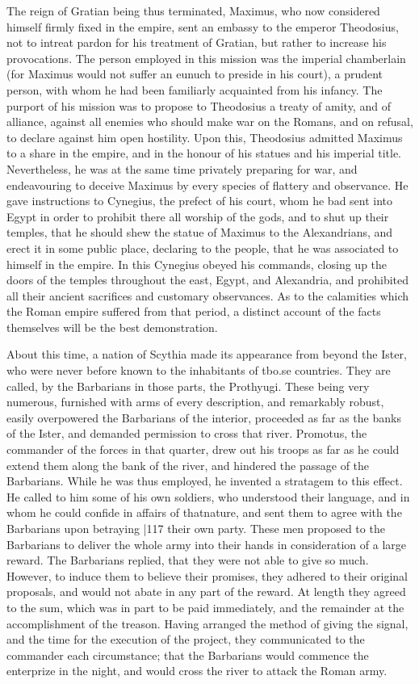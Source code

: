 The reign of Gratian being thus terminated, Maximus, who now considered himself firmly fixed in the empire, sent an embassy to the emperor Theodosius, not to intreat pardon for his treatment of Gratian, but rather to increase his provocations. The person employed in this mission was the imperial chamberlain (for Maximus would not suffer an eunuch to preside in his court), a prudent person, with whom he had been familiarly acquainted from his infancy. The purport of his mission was to propose to Theodosius a treaty of amity, and of alliance, against all enemies who should make war on the Romans, and on refusal, to declare against him open hostility. Upon this, Theodosius admitted Maximus to a share in the empire, and in the honour of his statues and his imperial title. Nevertheless, he was at the same time privately preparing for war, and endeavouring to deceive Maximus by every species of flattery and observance. He gave instructions to Cynegius, the prefect of his court, whom he bad sent into Egypt in order to prohibit there all worship of the gods, and to shut up their temples, that he should shew the statue of Maximus to the Alexandrians, and erect it in some public place, declaring to the people, that he was associated to himself in the empire. In this Cynegius obeyed his commands, closing up the doors of the temples throughout the east, Egypt, and Alexandria, and prohibited all their ancient sacrifices and customary observances. As to the calamities which the Roman empire suffered from that period, a distinct account of the facts themselves will be the best demonstration.

About this time, a nation of Scythia made its appearance from beyond the Ister, who were never before known to the inhabitants of tbo.se countries. They are called, by the Barbarians in those parts, the Prothyugi. These being very numerous, furnished with arms of every description, and remarkably robust, easily overpowered the Barbarians of the interior, proceeded as far as the banks of the Ister, and demanded permission to cross that river. Promotus, the commander of the forces in that quarter, drew out his troops as far as he could extend them along the bank of the river, and hindered the passage of the Barbarians. While he was thus employed, he invented a stratagem to this effect. He called to him some of his own soldiers, who understood their language, and in whom he could confide in affairs of that\emph{}nature, and sent them to agree with the Barbarians upon betraying
|117
their own party. These men proposed to the Barbarians to deliver the whole army into their hands in consideration of a large reward. The Barbarians replied, that they were not able to give so much. However, to induce them to believe their promises, they adhered to their original proposals, and would not abate in any part of the reward. At length they agreed to the sum, which was in part to be paid immediately, and the remainder at the accomplishment of the treason. Having arranged the method of giving the signal, and the time for the execution of the project, they communicated to the commander each circumstance; that the Barbarians would commence the enterprize in the night, and would cross the river to attack the Roman army.

